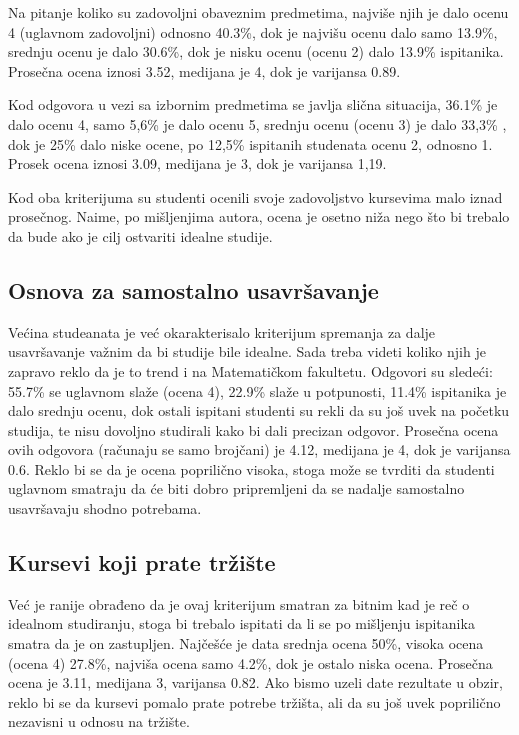 \documentclass[a4paper]{article}
\begin{document}
Na pitanje koliko su zadovoljni obaveznim predmetima, najviše njih je dalo ocenu 4 (uglavnom zadovoljni) odnosno 40.3\%, dok je najvišu ocenu dalo samo 13.9\%, srednju ocenu je dalo 30.6\%, dok je nisku ocenu (ocenu 2) dalo 13.9\% ispitanika. Prosečna ocena iznosi 3.52, medijana je 4, dok je varijansa 0.89.

Kod odgovora u vezi sa izbornim predmetima se javlja slična situacija, 36.1\% je dalo ocenu 4, samo 5,6\% je dalo ocenu 5, srednju ocenu (ocenu 3) je dalo 33,3\% , dok je 25\% dalo niske ocene, po 12,5\% ispitanih studenata ocenu 2, odnosno 1. Prosek ocena iznosi 3.09, medijana je 3, dok je varijansa 1,19. 

Kod oba kriterijuma su studenti ocenili svoje zadovoljstvo kursevima malo iznad prosečnog. Naime, po mišljenjima autora, ocena je osetno niža nego što bi trebalo da bude ako je cilj ostvariti idealne studije.

\subsection{Osnova za samostalno usavršavanje}
Većina studeanata je već okarakterisalo kriterijum spremanja za dalje usavršavanje važnim da bi studije bile idealne. Sada treba videti koliko njih je zapravo reklo da je to trend i na Matematičkom fakultetu.
Odgovori su sledeći: 55.7\%  se uglavnom slaže (ocena 4), 22.9\% slaže u potpunosti,  11.4\%  ispitanika je dalo srednju ocenu, dok ostali ispitani studenti su rekli da su još uvek na početku studija, te nisu dovoljno studirali kako bi dali precizan odgovor. Prosečna ocena ovih odgovora (računaju se samo brojčani) je  4.12, medijana je 4, dok je varijansa 0.6. Reklo bi se da je ocena poprilično visoka, stoga može se tvrditi da studenti uglavnom smatraju da će biti dobro pripremljeni da se nadalje samostalno usavršavaju shodno potrebama.


\subsection{Kursevi koji prate tržište}
\label{sec:naslovN}

Već je ranije obrađeno da je ovaj kriterijum smatran za bitnim kad je reč o idealnom studiranju, stoga bi trebalo ispitati da li se po mišljenju ispitanika smatra da je on zastupljen. Najčešće je data srednja ocena 50\%, visoka ocena (ocena 4) 27.8\%, najviša ocena samo 4.2\%, dok je ostalo niska ocena. Prosečna ocena je 3.11, medijana 3, varijansa 0.82. Ako bismo uzeli date rezultate u obzir, reklo bi se da kursevi pomalo prate potrebe tržišta, ali da su još uvek poprilično nezavisni u odnosu na tržište.
\end{document}
